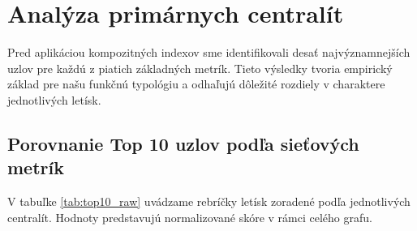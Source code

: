 \section{Analýza primárnych centralít}

Pred aplikáciou kompozitných indexov sme identifikovali desať najvýznamnejších uzlov pre každú z piatich základných metrík. 
Tieto výsledky tvoria empirický základ pre našu funkčnú typológiu a odhaľujú dôležité rozdiely v charaktere jednotlivých letísk.

\subsection{Porovnanie Top 10 uzlov podľa sieťových metrík}

V tabuľke \ref{tab:top10_raw} uvádzame rebríčky letísk zoradené podľa jednotlivých centralít. Hodnoty predstavujú normalizované 
skóre v rámci celého grafu.

\begin{table}[h!]
\centering
\small
{}
\caption{\centering Porovnanie Top 10 globálnych letísk podľa piatich primárnych centralít.}
\label{tab:top10_raw}
\end{table}


